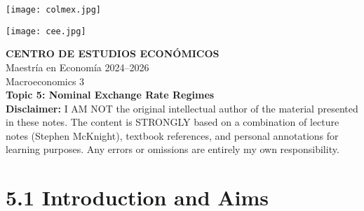\documentclass[12pt]{article}
\title{}
\author{}
\date{}
\begin{document}
\begin{titlepage}
    \vspace*{-1cm}
    \noindent
    \begin{minipage}[t]{0.49\textwidth}
        \texttt{[image: colmex.jpg]}
    \end{minipage}%
    \begin{minipage}[t]{0.49\textwidth}
        \raggedleft
        \texttt{[image: cee.jpg]}
    \end{minipage}

    \vspace*{2cm}

    \begin{center}
        \Huge \textbf{CENTRO DE ESTUDIOS ECONÓMICOS} \\[1.5em]
        \Large Maestría en Economía 2024--2026 \\[2em]
        \Large Macroeconomics 3 \\[3em]
        \LARGE \textbf{Topic 5: Nominal Exchange Rate Regimes
} \\[6em]
        \large \textbf{Disclaimer:} I AM NOT the original intellectual author of the material presented in these notes. The content is STRONGLY based on a combination of lecture notes (Stephen McKnight), textbook references, and personal annotations for learning purposes. Any errors or omissions are entirely my own responsibility.\\[0.9em]
        
    \end{center}

    \vfill
\end{titlepage}

\newpage

\setcounter{secnumdepth}{2}
\setcounter{tocdepth}{3}
\tableofcontents

\newpage

\section*{\noindent\textbf{5.1 Introduction and Aims}}
\end{document}
